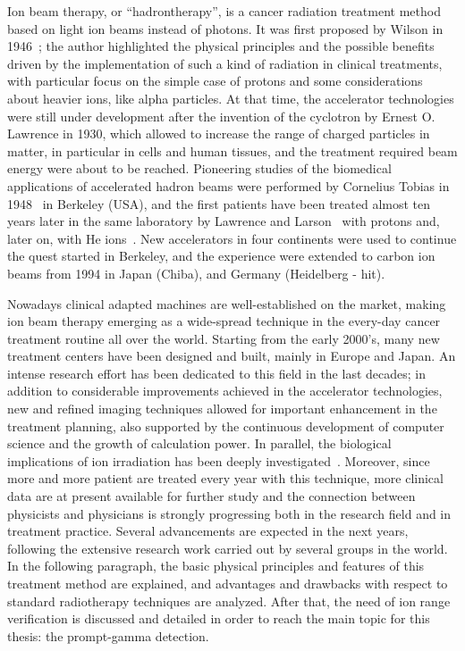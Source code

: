 Ion beam therapy, or \enquote{hadrontherapy}, is a cancer radiation treatment method based on light ion beams instead of photons. It was first proposed by Wilson in 1946~\parencite{Wilson1946}; the author highlighted the physical principles and the possible benefits driven by the implementation of such a kind of radiation in clinical treatments, with particular focus on the simple case of protons and some considerations about heavier ions, like alpha particles. At that time, the accelerator technologies were still under development after the invention of the cyclotron by Ernest O. Lawrence in 1930, which allowed to increase the range of charged particles in matter, in particular in cells and human tissues, and the treatment required beam energy were about to be reached. Pioneering studies of the biomedical applications of accelerated hadron beams were performed by Cornelius Tobias in 1948~\parencite{Blakely2009} in Berkeley (USA), and the first patients have been treated almost ten years later in the same laboratory by Lawrence and Larson~\parencite{Tobias1955, Tobias1958} with protons and, later on, with He ions~\parencite{Halperin2006}. New accelerators in four continents were used to continue the quest started in Berkeley, and the experience were extended to carbon ion beams from 1994 in Japan (Chiba), and Germany (Heidelberg - \gls{hit}). 

Nowadays clinical adapted machines are well-established on the market, making ion beam therapy emerging as a wide-spread technique in the every-day cancer treatment routine all over the world. Starting from the early 2000's, many new treatment centers have been designed and built, mainly in Europe and Japan. An intense research effort has been dedicated to this field in the last decades; in addition to considerable improvements achieved in the accelerator technologies, new and refined imaging techniques allowed for important enhancement in the treatment planning, also supported by the continuous development of computer science and the growth of calculation power. In parallel, the biological implications of ion irradiation has been deeply investigated~\parencite{Tobias1982, Brahme2004, Friedrich2012, }. Moreover, since more and more patient are treated every year with this technique, more clinical data are at present available for further study and the connection between physicists and physicians is strongly progressing both in the research field and in treatment practice. Several advancements are expected in the next years, following the extensive research work carried out by several groups in the world. In the following paragraph, the basic physical principles and features of this treatment method are explained, and advantages and drawbacks with respect to standard radiotherapy techniques are analyzed. After that, the need of ion range verification is discussed and detailed in order to reach the main topic for this thesis: the prompt-gamma detection.   

